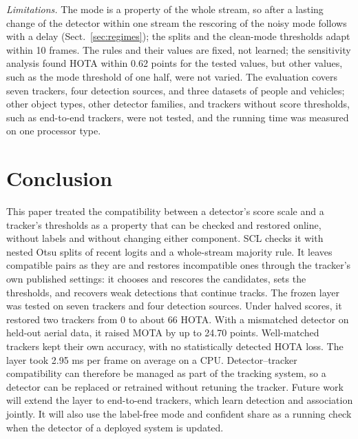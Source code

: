 \documentclass[pdflatex,sn-mathphys-num,iicol]{sn-jnl}
\newcommand{\scl}{SCL}
\begin{document}
\emph{Limitations.} The mode is a property of the whole stream, so after a lasting change of the
detector within one stream the rescoring of the noisy mode follows with a delay
(Sect.~\ref{sec:regimes}); the splits and the clean-mode thresholds adapt within 10 frames. The
rules and their values are fixed, not learned; the sensitivity analysis found HOTA within 0.62
points for the tested values, but other values, such as the mode threshold of one half, were not
varied. The evaluation covers seven trackers, four detection sources, and three datasets of people
and vehicles; other object types, other detector families, and trackers without score thresholds,
such as end-to-end trackers, were not tested, and the running time was measured on one processor
type.
\section{Conclusion}\label{sec:conclusion}

This paper treated the compatibility between a detector's score scale and a tracker's thresholds
as a property that can be checked and restored online, without labels and without changing either
component. \scl{} checks it with nested Otsu splits of recent logits and a whole-stream majority
rule. It leaves compatible pairs as they are and restores incompatible ones through the tracker's
own published settings: it chooses and rescores the candidates, sets the thresholds, and recovers
weak detections that continue tracks. The frozen layer was tested on seven trackers and four
detection sources. Under halved scores, it restored two trackers from 0 to about 66 HOTA. With a
mismatched detector on held-out aerial data, it raised MOTA by up to 24.70 points. Well-matched
trackers kept their own accuracy, with no statistically detected HOTA loss. The layer took 2.95 ms
per frame on average on a CPU. Detector--tracker compatibility can therefore be managed as part of
the tracking system, so a detector can be replaced or retrained without retuning the tracker.
Future work will extend the layer to end-to-end trackers, which learn detection and association
jointly. It will also use the label-free mode and confident share as a running check when the
detector of a deployed system is updated.

\FloatBarrier
\backmatter

\end{document}

